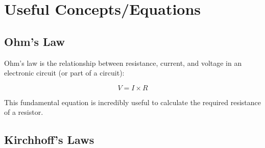 \documentclass[a4]{report}
\begin{document}
	\section{Useful Concepts/Equations}
	
	\subsection{Ohm's Law}
	
	Ohm's law is the relationship between resistance, current, and voltage in an electronic circuit (or part of a circuit):
	
	\begin{equation}
		V= I \times R
		\label{eqnohmlaw}
	\end{equation}
	
	This fundamental equation is incredibly useful to calculate the required resistance of a resistor.
	
	\subsection{Kirchhoff's Laws}
	
\end{document}
